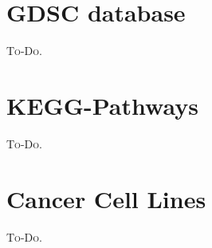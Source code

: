 
\section{GDSC database}
\textsc{To-Do.}

\section{KEGG-Pathways}
\textsc{To-Do.}

\section{Cancer Cell Lines}
\textsc{To-Do.}
